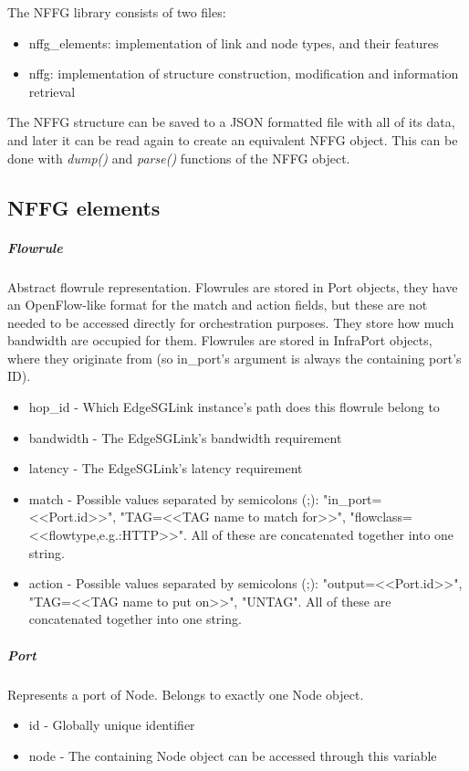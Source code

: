 \documentclass[a4paper,10pt]{scrartcl}
\begin{document}
The NFFG library consists of two files:
\begin{itemize}
\item nffg\_elements: implementation of link and node types, and their features
\item nffg: implementation of structure construction, modification and information retrieval
\end{itemize}

The NFFG structure can be saved to a JSON formatted file with all of its data, 
and later it can be read again to create an equivalent NFFG object. 
This can be done with \emph{dump()} and \emph{parse()} functions of the NFFG object.

\subsection{NFFG elements}

\subparagraph{Flowrule}
Abstract flowrule representation. Flowrules are stored in Port objects, 
they have an OpenFlow-like format for the match and action fields, 
but these are not needed to be accessed directly for orchestration purposes.
They store how much bandwidth are occupied for them. Flowrules are stored in InfraPort 
objects, where they originate from (so in\_port's argument is always the containing port's ID).
\begin{itemize}
\item hop\_id - Which EdgeSGLink instance's path does this flowrule belong to
\item bandwidth - The EdgeSGLink's bandwidth requirement
\item latency - The EdgeSGLink's latency requirement
\item match - Possible values separated by semicolons (;): "in\_port=<<Port.id>>", 
"TAG=<<TAG name to match for>>", "flowclass=<<flowtype,e.g.:HTTP>>". All of these are 
concatenated together into one string.
\item action - Possible values separated by semicolons (;): "output=<<Port.id>>", 
"TAG=<<TAG name to put on>>", "UNTAG". All of these are concatenated together into one string.
\end{itemize}

\subparagraph{Port}
Represents a port of Node. Belongs to exactly one Node object. 
\begin{itemize}
\item id - Globally unique identifier
\item node - The containing Node object can be accessed through this variable
\end{itemize}
\end{document}
